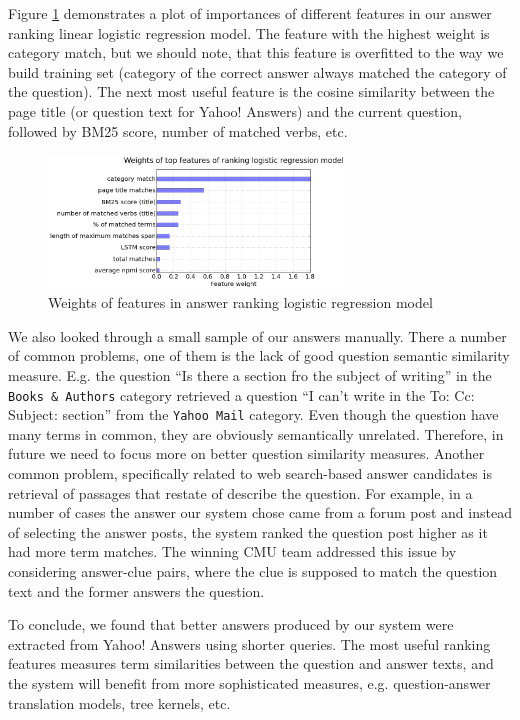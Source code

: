 \documentclass[]{article}
\begin{document}
Figure \ref{figure:features} demonstrates a plot of importances of different features in our answer ranking linear logistic regression model.
The feature with the highest weight is category match, but we should note, that this feature is overfitted to the way we build training set (category of the correct answer always matched the category of the question).
The next most useful feature is the cosine similarity between the page title (or question text for Yahoo! Answers) and the current question, followed by BM25 score, number of matched verbs, etc.

\begin{figure}
\centering
	\includegraphics[width=0.7\textwidth]{img/features}
	\caption{Weights of features in answer ranking logistic regression model}
	\label{figure:features}
\end{figure}

We also looked through a small sample of our answers manually.
There a number of common problems, one of them is the lack of good question semantic similarity measure.
E.g. the question ``Is there a section fro the subject of writing'' in the \texttt{Books \& Authors} category retrieved a question ``I can't write in the To: Cc: Subject: section'' from the \texttt{Yahoo Mail} category.
Even though the question have many terms in common, they are obviously semantically unrelated.
Therefore, in future we need to focus more on better question similarity measures.
Another common problem, specifically related to web search-based answer candidates is retrieval of passages that restate of describe the question.
For example, in a number of cases the answer our system chose came from a forum post and instead of selecting the answer posts, the system ranked the question post higher as it had more term matches.
The winning CMU team addressed this issue by considering answer-clue pairs, where the clue is supposed to match the question text and the former answers the question.

To conclude, we found that better answers produced by our system were extracted from Yahoo! Answers using shorter queries.
The most useful ranking features measures term similarities between the question and answer texts, and the system will benefit from more sophisticated measures, e.g. question-answer translation models, tree kernels, etc.
\end{document}
